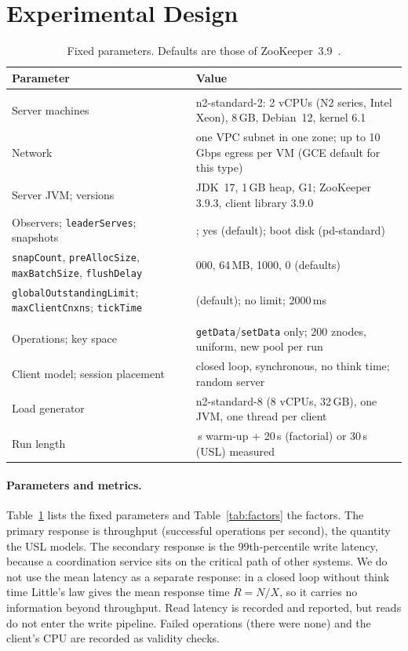 \documentclass{llncs}
\begin{document}
\section{Experimental Design}
\label{sec:design}

\begin{table}[t]
  \centering
  \caption{Fixed parameters. Defaults are those of ZooKeeper~3.9~\cite{zookeeper_admin}.}
  \label{tab:params}
  \scriptsize
  \begin{tabularx}{\linewidth}{@{}>{\raggedright\arraybackslash}p{4.3cm}>{\raggedright\arraybackslash}X@{}}
    \toprule
    Parameter & Value \\
    \midrule
    \multicolumn{2}{@{}l}{\emph{System}} \\
    Server machines & n2-standard-2: 2 vCPUs (N2 series, Intel Xeon), 8\,GB, Debian~12, kernel 6.1 \\
    Network & one VPC subnet in one zone; up to 10\,Gbps egress per VM (GCE default for this type) \\
    Server JVM; versions & JDK~17, 1\,GB heap, G1; ZooKeeper 3.9.3, client library 3.9.0 \\
    Observers; \texttt{leaderServes}; snapshots & 0; yes (default); boot disk (pd-standard) \\
    \texttt{snapCount}, \texttt{preAllocSize}, \texttt{maxBatchSize}, \texttt{flushDelay} & 100{,}000, 64\,MB, 1000, 0 (defaults) \\
    \texttt{globalOutstandingLimit}; \texttt{maxClientCnxns}; \texttt{tickTime} & 1000 (default); no limit; 2000\,ms \\
    \multicolumn{2}{@{}l}{\emph{Workload}} \\
    Operations; key space & \texttt{getData}/\texttt{setData} only; 200 znodes, uniform, new pool per run \\
    Client model; session placement & closed loop, synchronous, no think time; random server \\
    Load generator & n2-standard-8 (8 vCPUs, 32\,GB), one JVM, one thread per client \\
    Run length & 5\,s warm-up + 20\,s (factorial) or 30\,s (USL) measured \\
    \bottomrule
  \end{tabularx}
\end{table}

\paragraph{Parameters and metrics.} Table~\ref{tab:params} lists the fixed parameters and Table~\ref{tab:factors} the factors. The primary response is throughput (successful operations per second), the quantity the USL models. The secondary response is the 99th-percentile write latency, because a coordination service sits on the critical path of other systems. We do not use the mean latency as a separate response: in a closed loop without think time Little's law gives the mean response time $R=N/X$, so it carries no information beyond throughput. Read latency is recorded and reported, but reads do not enter the write pipeline. Failed operations (there were none) and the client's CPU are recorded as validity checks.
\end{document}
